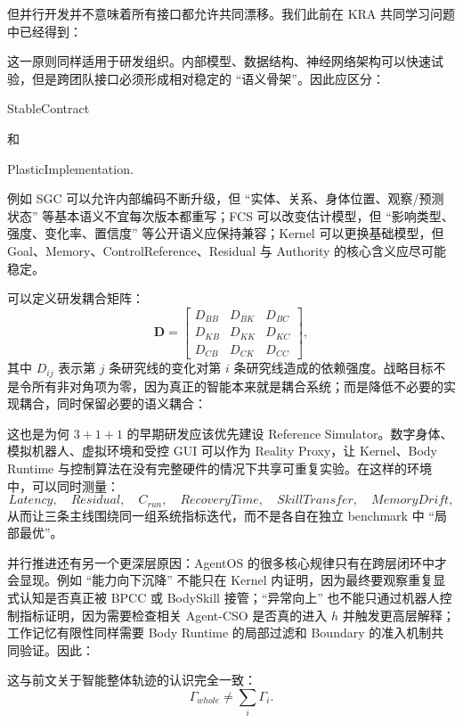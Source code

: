 但并行开发并不意味着所有接口都允许共同漂移。我们此前在 KRA 共同学习问题中已经得到：
\begin{statementbox}
\centering
{}
\end{statementbox}
这一原则同样适用于研发组织。内部模型、数据结构、神经网络架构可以快速试验，但是跨团队接口必须形成相对稳定的 ``语义骨架''。因此应区分：
\begin{statementbox}
StableContract
\end{statementbox}
和
\begin{statementbox}
PlasticImplementation.
\end{statementbox}
例如 SGC 可以允许内部编码不断升级，但 ``实体、关系、身体位置、观察/预测状态'' 等基本语义不宜每次版本都重写；FCS 可以改变估计模型，但 ``影响类型、强度、变化率、置信度'' 等公开语义应保持兼容；Kernel 可以更换基础模型，但 Goal、Memory、ControlReference、Residual 与 Authority 的核心含义应尽可能稳定。

可以定义研发耦合矩阵：
\[
\mathbf D
=
\begin{bmatrix}
D_{BB} & D_{BK} & D_{BC}\\
D_{KB} & D_{KK} & D_{KC}\\
D_{CB} & D_{CK} & D_{CC}
\end{bmatrix},
\]
其中 $D_{ij}$ 表示第 $j$ 条研究线的变化对第 $i$ 条研究线造成的依赖强度。战略目标不是令所有非对角项为零，因为真正的智能本来就是耦合系统；而是降低不必要的实现耦合，同时保留必要的语义耦合：
\begin{statementbox}
\centering
{}
\end{statementbox}

这也是为何 $3+1+1$ 的早期研发应该优先建设 Reference Simulator。数字身体、模拟机器人、虚拟环境和受控 GUI 可以作为 Reality Proxy，让 Kernel、Body Runtime 与控制算法在没有完整硬件的情况下共享可重复实验。在这样的环境中，可以同时测量：
\[
Latency,\quad
Residual,\quad
C_{run},\quad
RecoveryTime,\quad
SkillTransfer,\quad
MemoryDrift,
\]
从而让三条主线围绕同一组系统指标迭代，而不是各自在独立 benchmark 中 ``局部最优''。

并行推进还有另一个更深层原因：AgentOS 的很多核心规律只有在跨层闭环中才会显现。例如 ``能力向下沉降'' 不能只在 Kernel 内证明，因为最终要观察重复显式认知是否真正被 BPCC 或 BodySkill 接管；``异常向上'' 也不能只通过机器人控制指标证明，因为需要检查相关 Agent-CSO 是否真的进入 $h$ 并触发更高层解释；工作记忆有限性同样需要 Body Runtime 的局部过滤和 Boundary 的准入机制共同验证。因此：
\begin{statementbox}
\centering
{}
\end{statementbox}
这与前文关于智能整体轨迹的认识完全一致：
\[
\Gamma_{whole}
\neq
\sum_i \Gamma_i.
\]

